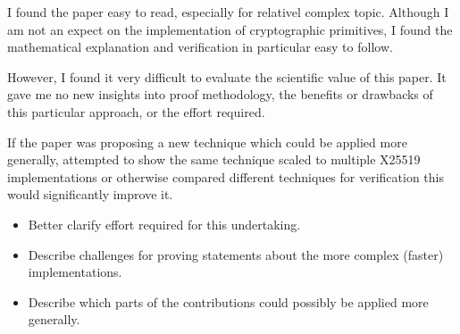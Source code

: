 \begin{center}
\end{center}

I found the paper easy to read, especially for relativel complex topic.
Although I am not an expect on the implementation of cryptographic primitives, I found the mathematical explanation and verification in particular easy to follow.

However, I found it very difficult to evaluate the scientific value of this paper. It gave me no new insights into proof methodology, the benefits or drawbacks of this particular approach, or the effort required.

If the paper was proposing a new technique which could be applied more generally, attempted to show the same technique scaled to multiple X25519 implementations or otherwise compared different techniques for verification this would significantly improve it.

\begin{center}
\end{center}

\begin{itemize}
    \item  Better clarify effort required for this undertaking.
    \item  Describe challenges for proving statements about the more complex (faster) implementations.
    \item  Describe which parts of the contributions could possibly be applied more generally.
\end{itemize}
